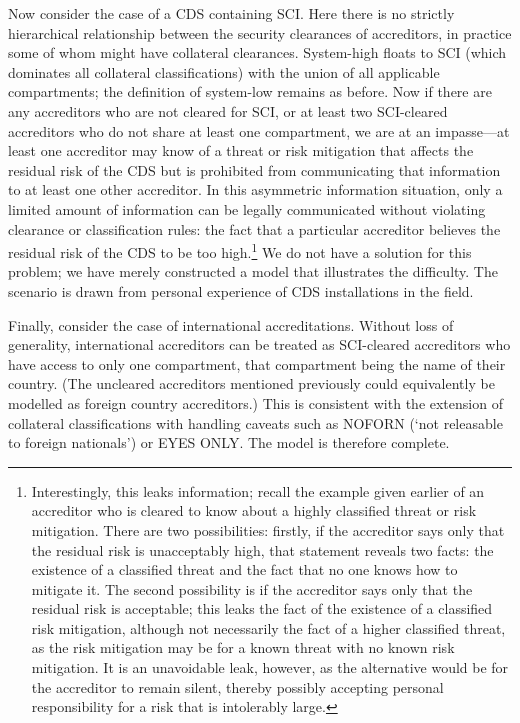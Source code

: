 \documentclass{llncs}
\begin{document}
Now consider the case of a CDS containing SCI.  Here there is no strictly hierarchical
relationship between the security clearances of accreditors, in practice some of whom
might have collateral clearances.  System-high floats to SCI (which dominates all
collateral classifications) with the union
of all applicable compartments; the definition of system-low remains as before.
Now if there are any accreditors who are not cleared for SCI, or at least two
SCI-cleared accreditors who do not share at least one compartment, we are at an
impasse---at least one accreditor may know of a threat or risk mitigation that
affects the residual risk of the CDS but is prohibited from communicating that
information to at least one other accreditor.  In this asymmetric information situation,
only a limited amount of information can be legally communicated without violating clearance
or classification rules: the fact that a particular accreditor believes the residual
risk of the CDS to be too high.\footnote{Interestingly, this leaks information; recall
the example given earlier of an accreditor who is cleared to know about a highly
classified threat or risk mitigation.  There are two possibilities: firstly, if the
accreditor says only that the residual risk is unacceptably high, that statement
reveals two facts: the existence of a classified threat and the fact that no one
knows how to mitigate it.  The second possibility is if the accreditor says only that
the residual risk is acceptable; this leaks the fact of the existence of a classified
risk mitigation, although not necessarily the fact of a higher classified threat, as
the risk mitigation may be for a known threat with no known risk mitigation.
It is an unavoidable leak, however, as the alternative would be for the accreditor
to remain silent, thereby possibly accepting personal responsibility for a risk
that is intolerably large.} We do not have a solution for this problem; we have
merely constructed a model that illustrates the difficulty.  The scenario is drawn
from personal experience of CDS installations in the field.

Finally, consider the case of international accreditations.  Without loss of generality,
international accreditors can be treated as SCI-cleared accreditors who have access to
only one compartment, that compartment being the name of their country.  (The uncleared
accreditors mentioned previously could equivalently be modelled as foreign country
accreditors.)  This is consistent with the extension of collateral classifications with
handling caveats such as NOFORN (`not releasable to foreign nationals') or EYES ONLY.
The model is therefore complete.
\end{document}
